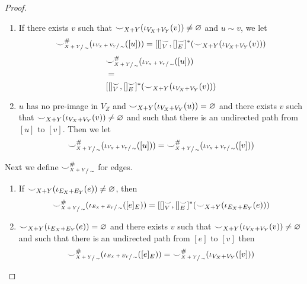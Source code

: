 \begin{proof}
    \begin{enumerate}
        \item If there exists $v$ such that ${\smile}_{X+Y}(\iota_{V_{X} + V_{Y}}(v)) \not = \varnothing$ and $u \sim v$, we let
              \ifdefined \ONECOLUMN
              \[
                {\smile}_{\sfrac{X+Y}{\sim}}^{{\#}}(\iota_{\sfrac{V_{X} + V_{Y}}{\sim}}([u]))
                =
                [[]_{V}^{{\smile}},[]_{E}^{{\smile}}]^{*}({\smile}_{X+Y}(\iota_{V_{X} + V_{Y}}(v)))
              \]
              \else
              \begin{align*}
                &{\smile}_{\sfrac{X+Y}{\sim}}^{{\#}}(\iota_{\sfrac{V_{X} + V_{Y}}{\sim}}([u]))\\
                &=\\
                &[[]_{V}^{{\smile}},[]_{E}^{{\smile}}]^{*}({\smile}_{X+Y}(\iota_{V_{X} + V_{Y}}(v)))
            \end{align*}
            \fi
        \item $u$ has no pre-image in $V_{Z}$ and ${\smile}_{X+Y}(\iota_{V_{X} + V_{Y}}(u)) = \varnothing$ and there exists $v$ such that ${\smile}_{X+Y}(\iota_{V_{X} + V_{Y}}(v)) \not = \varnothing$ and such that there is an undirected path from $[u]$ to $[v]$.
        Then we let
        \[
            {\smile}_{\sfrac{X+Y}{\sim}}^{{\#}}(\iota_{\sfrac{V_{X} + V_{Y}}{\sim}}([u])) = {\smile}_{\sfrac{X+Y}{\sim}}^{{\#}}(\iota_{\sfrac{V_{X} + V_{Y}}{\sim}}([v]))
        \]
    \end{enumerate}

    Next we define ${\smile}_{\sfrac{X+Y}{\sim}}^{{\#}}$ for edges.

    \begin{enumerate}
        \item If ${\smile}_{X+Y}(\iota_{E_{X} + E_{Y}}(e)) \not = \varnothing$, then
                \begin{align*}
                    {\smile}_{\sfrac{X+Y}{\sim}}^{{\#}}(\iota_{\sfrac{E_{X} + E_{Y}}{\sim}}([e]_{E})) =
                    [[]_{V}^{{\smile}}, []_{E}^{{\smile}}]^{*}({\smile}_{X+Y}(\iota_{E_{X} + E_{Y}}(e)))
                \end{align*}
        \item ${\smile}_{X+Y}(\iota_{E_{X} + E_{Y}}(e)) = \varnothing$ and there exists $v$ such that ${\smile}_{X+Y}(\iota_{V_{X} + V_{Y}}(v)) \not = \varnothing$ and such that there is an undirected path from $[e]$ to $[v]$
        then
        \[
            {\smile}_{\sfrac{X+Y}{\sim}}^{{\#}}(\iota_{\sfrac{E_{X} + E_{Y}}{\sim}}([e]_{E})) = {\smile}_{\sfrac{X+Y}{\sim}}^{{\#}}(\iota_{V_{X} + V_{Y}}([v]))
        \]
    \end{enumerate}
    

\end{proof}

